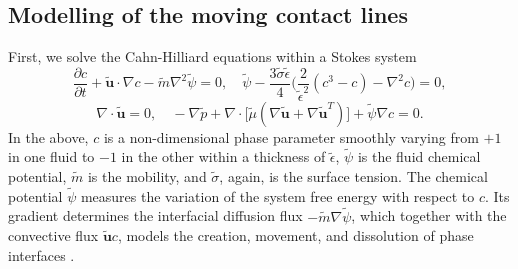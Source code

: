 

\subsection{Modelling of the moving contact lines} \label{model}
%

 First, we solve the Cahn-Hilliard equations within a Stokes system
\begin{equation} \label{C-H}
  \frac{\partial c}{\partial t} + \tilde{{\bm u}}\cdot \nabla c -\tilde{m}\nabla ^2 \tilde{\psi}=0,
  \quad \tilde{\psi} - \frac{3\tilde{\sigma} \tilde{\epsilon}}{4} 
  \bigg(\frac{2}{\tilde{\epsilon}^2}(c^3-c) -\nabla ^2 c \bigg) =0,
\end{equation}
\begin{equation} \label{C-H Stokes}
    \nabla \cdot \tilde{{\bm u}} = 0, \quad
    -\nabla \tilde{p} + \nabla \cdot 
    \big[ \tilde{\mu} ( \nabla \tilde{{\bm u}} + \nabla \tilde{{\bm u}}^T ) \big] +\tilde{\psi}\nabla c = 0.
\end{equation}
In the above, $c$ is a non-dimensional phase parameter smoothly varying from $+1$ in one fluid to $-1$ in the other within a thickness of $\tilde{\epsilon}$, $\tilde{\psi}$ is the fluid chemical potential, $\tilde{m}$ is the mobility, and $\tilde{\sigma}$, again, is the surface tension. The chemical potential $\tilde{\psi}$ measures the variation of the system free energy with respect to $c$. Its gradient determines the interfacial diffusion flux $-\tilde{m}\nabla \tilde{\psi}$, which together with the convective flux $\tilde{{\bm u}} c$, models the creation, movement, and dissolution of phase interfaces \cite{Jacqmin2000}. %

